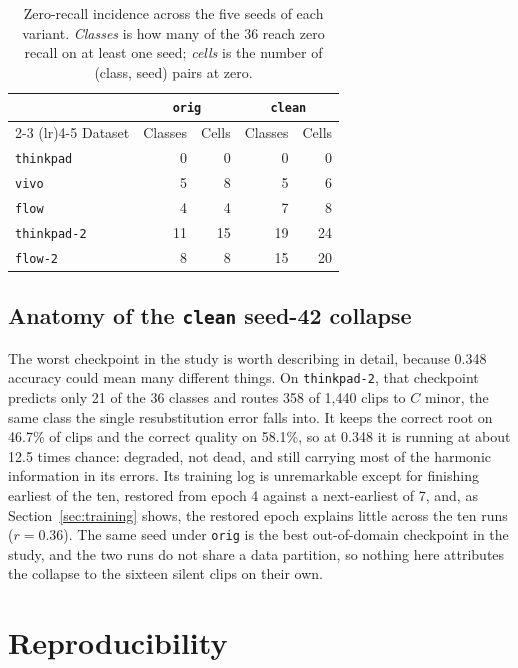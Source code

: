 \documentclass[pdflatex,sn-mathphys-num]{sn-jnl}
\begin{document}
\begin{table}[t]
\caption{Zero-recall incidence across the five seeds of each variant. \emph{Classes} is how many of the 36 reach zero recall on at least one seed; \emph{cells} is the number of (class, seed) pairs at zero.}\label{tab:esm-zero}
\setlength{\tabcolsep}{5pt}
\begin{tabular}{@{}lrrrr@{}}
\toprule
 & \multicolumn{2}{c}{\texttt{orig}} & \multicolumn{2}{c}{\texttt{clean}} \\
\cmidrule(lr){2-3} \cmidrule(lr){4-5}
Dataset & Classes & Cells & Classes & Cells \\
\midrule
\texttt{thinkpad} & 0 & 0 & 0 & 0 \\
\texttt{vivo} & 5 & 8 & 5 & 6 \\
\texttt{flow} & 4 & 4 & 7 & 8 \\
\texttt{thinkpad-2} & 11 & 15 & 19 & 24 \\
\texttt{flow-2} & 8 & 8 & 15 & 20 \\
\bottomrule
\end{tabular}
\end{table}

\subsection{Anatomy of the \texttt{clean} seed-42 collapse}\label{sec:collapse}

The worst checkpoint in the study is worth describing in detail, because 0.348 accuracy could mean many different things. On \texttt{thinkpad-2}, that checkpoint predicts only 21 of the 36 classes and routes 358 of 1{,}440 clips to $C$ minor, the same class the single resubstitution error falls into. It keeps the correct root on 46.7\% of clips and the correct quality on 58.1\%, so at 0.348 it is running at about 12.5 times chance: degraded, not dead, and still carrying most of the harmonic information in its errors. Its training log is unremarkable except for finishing earliest of the ten, restored from epoch 4 against a next-earliest of 7, and, as Section~\ref{sec:training} shows, the restored epoch explains little across the ten runs ($r=0.36$). The same seed under \texttt{orig} is the best out-of-domain checkpoint in the study, and the two runs do not share a data partition, so nothing here attributes the collapse to the sixteen silent clips on their own.

\section{Reproducibility}\label{sec:repro}
\end{document}
